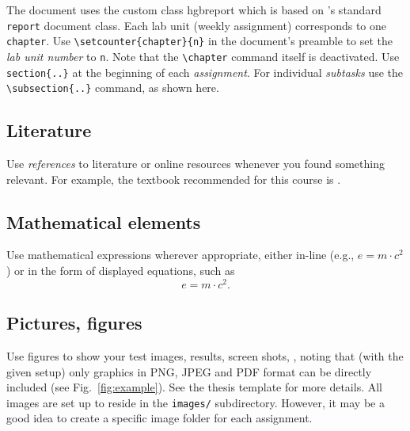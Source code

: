 \documentclass[english,notitlepage,smartquotes]{hgbreport}
\renewcommand{\chapter}[1]{} %
\begin{document}
The document uses the custom class \textsf{hgbreport} which is based on
\latex's standard \texttt{report} document class. Each lab unit (weekly
assignment) corresponds to one \texttt{chapter}. Use
\verb!\setcounter{chapter}{n}! in the document's preamble to set the
\emph{lab unit number} to \texttt{n}. Note that the \verb!\chapter! command
itself is deactivated. Use \verb!section{..}! at the beginning of each
\emph{assignment}. For individual \emph{subtasks} use the
\verb!\subsection{..}! command, as shown here.

\subsection{Literature}

Use \emph{references} to literature or online resources whenever you found 
something relevant. For example, the textbook recommended for this course is
\cite{Sedgewick2011}.

\subsection{Mathematical elements}

Use mathematical expressions wherever appropriate, either in-line 
(e.g., $e = m \cdot c^2$) or in the form of displayed equations, such as
%
\begin{equation}
	e = m \cdot c^2 .
\end{equation}

\subsection{Pictures, figures}

Use figures to show your test images, results, screen shots, \etc, noting
that (with the given setup) only graphics in PNG, JPEG and PDF format can be
directly included (see Fig.~\ref{fig:example}). See the thesis template for
more details. All images are set up to reside in the \verb!images/!
subdirectory. However, it may be a good idea to create a specific image
folder for each assignment.
\end{document}

